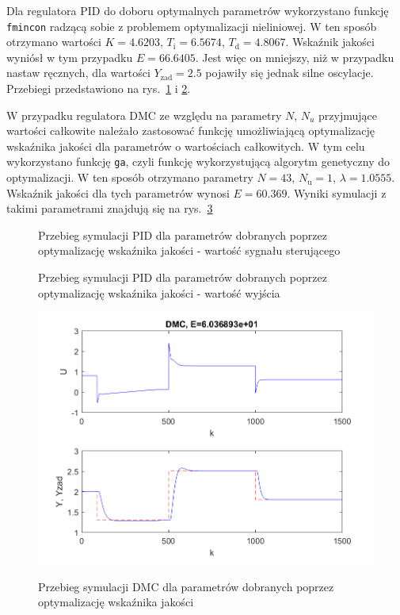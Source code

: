 Dla regulatora PID do doboru optymalnych parametrów wykorzystano funkcję \verb+fmincon+ radzącą sobie z problemem optymalizacji nieliniowej. W ten sposób otrzymano wartości $K=\num{4.6203}$, $T_\mathrm{i}=\num{6.5674}$, $T_\mathrm{d}=\num{4.8067}$. Wskaźnik jakości wyniósł w tym przypadku $E=\num{66.6405}$. Jest więc on mniejszy, niż w przypadku nastaw ręcznych, dla wartości $Y_\mathrm{zad}=\num{2.5}$ pojawiły się jednak silne oscylacje. Przebiegi przedstawiono na rys.~\ref{pidoptu} i \ref{pidopty}.

W przypadku regulatora DMC ze względu na parametry $N$, $N_u$ przyjmujące wartości całkowite należało zastosować funkcję umożliwiającą optymalizację wskaźnika jakości dla parametrów o wartościach całkowitych. W tym celu wykorzystano funkcję \verb+ga+, czyli funkcję wykorzystującą algorytm genetyczny do optymalizacji. W ten sposób otrzymano parametry $N=43$, $N_\mathrm{u}=1$, $\lambda=\num{1.0555}$. Wskaźnik jakości dla tych parametrów wynosi $E=\num{60.369}$. Wyniki symulacji z takimi parametrami znajdują się na rys.~\ref{dmcopt}



\begin{figure}

	\centering
	\caption{Przebieg symulacji PID dla parametrów dobranych poprzez optymalizację wskaźnika jakości - wartość sygnału sterującego}
	
		\label{pidoptu}
\end{figure}

\begin{figure}

	\centering
	\caption{Przebieg symulacji PID dla parametrów dobranych poprzez optymalizację wskaźnika jakości - wartość wyjścia}
	
		\label{pidopty}
\end{figure}

\begin{figure}

	\centering
	\caption{Przebieg symulacji DMC dla parametrów dobranych poprzez optymalizację wskaźnika jakości}
	\includegraphics{dmc_optimized.png}
		\label{dmcopt}
\end{figure}